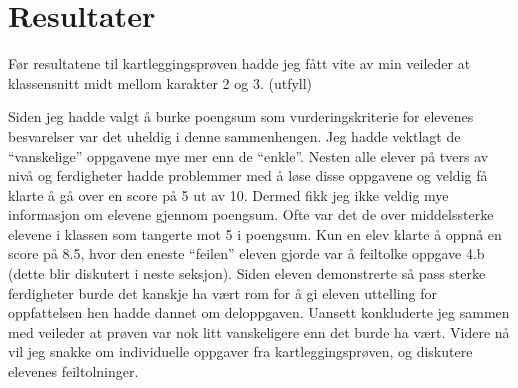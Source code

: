 \documentclass[main.tex]{subfiles}
\begin{document}
\section*{Resultater}
\label{sec:4}

Før resultatene til kartleggingsprøven hadde jeg fått vite av min veileder at klassensnitt midt mellom
karakter 2 og 3. (utfyll)

Siden jeg hadde valgt å burke poengsum som vurderingskriterie for elevenes besvarelser var det 
uheldig i denne sammenhengen. Jeg hadde vektlagt de ``vanskelige'' oppgavene mye mer enn de 
``enkle''. Nesten alle elever på tvers av nivå og ferdigheter hadde 
problemmer med å løse disse oppgavene og veldig få klarte å gå over en score på 5 ut av 10. Dermed fikk jeg ikke 
veldig mye informasjon om elevene gjennom poengsum. Ofte var det de over middelssterke elevene i klassen som tangerte
mot 5 i poengsum. Kun en elev klarte å oppnå en score på 8.5, hvor den eneste ``feilen'' eleven gjorde var å
feiltolke oppgave 4.b (dette blir diskutert i neste seksjon). Siden eleven demonstrerte så pass sterke ferdigheter 
burde det kanskje ha vært rom for å gi eleven uttelling for oppfattelsen hen hadde dannet om deloppgaven. 
Uansett konkluderte jeg sammen med veileder at prøven var nok litt vanskeligere enn det burde ha vært. Videre nå vil 
jeg snakke om individuelle oppgaver fra kartleggingsprøven, og diskutere elevenes feiltolninger.
\end{document}
